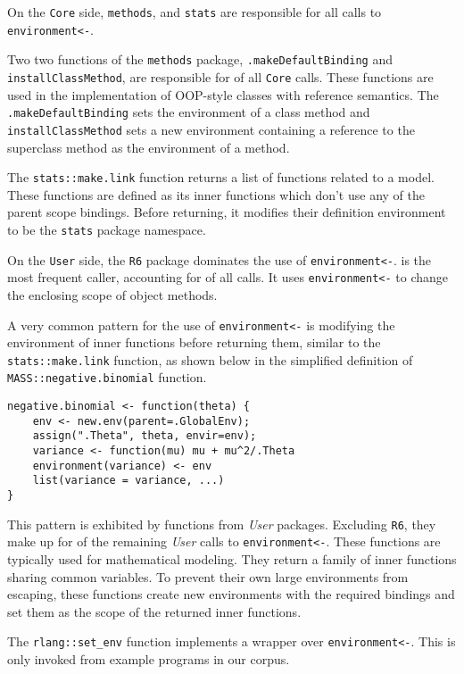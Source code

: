 \documentclass[10pt,review,sigplan,authorversion=true]{acmart}
\renewcommand{\c}[1]{\lstinline |#1|\xspace}
\begin{document}
On the \c{Core} side, \c{methods}, and \c{stats} are responsible for all calls
to \c{environment<-}.

Two two functions of the \c{methods} package, \c{.makeDefaultBinding} and
\c{installClassMethod}, are responsible for \EnvAsnMethodsCallPerc of all
\c{Core} calls. These functions are used in the implementation of OOP-style
classes with reference semantics. The \c{.makeDefaultBinding} sets the
environment of a class method and \c{installClassMethod} sets a new environment
containing a reference to the superclass method as the environment of a method.

The \c{stats::make.link} function returns a list of functions related to a
model. These functions are defined as its inner functions which don't use any of
the parent scope bindings. Before returning, it modifies their definition
environment to be the \c{stats} package namespace.

On the \c{User} side, the \c{R6} package dominates the use of \c{environment<-}.
\EnvAsnOneCallerName is the most frequent caller, accounting for
\EnvAsnOneCallPerc of all calls. It uses \c{environment<-} to change the
enclosing scope of object methods.

A very common pattern for the use of \c{environment<-} is modifying the
environment of inner functions before returning them, similar to the
\c{stats::make.link} function, as shown below in the simplified definition of
\c{MASS::negative.binomial} function.

\begin{lstlisting}
negative.binomial <- function(theta) {
    env <- new.env(parent=.GlobalEnv);
    assign(".Theta", theta, envir=env);
    variance <- function(mu) mu + mu^2/.Theta
    environment(variance) <- env
    list(variance = variance, ...)
}

\end{lstlisting}

This pattern is exhibited by \EnvAsnUserInnerFunFunCnt functions from
\EnvAsnUserInnerFunPackCnt \emph{User} packages. Excluding \c{R6}, they make up
for \EnvAsnUserInnerFunCallPerc of the remaining \emph{User} calls to
\c{environment<-}. These functions are typically used for mathematical modeling.
They return a family of inner functions sharing common variables. To prevent
their own large environments from escaping, these functions create new
environments with the required bindings and set them as the scope of the
returned inner functions.

The \c{rlang::set_env} function implements a wrapper over \c{environment<-}.
This is only invoked from example programs in our corpus.
\end{document}
